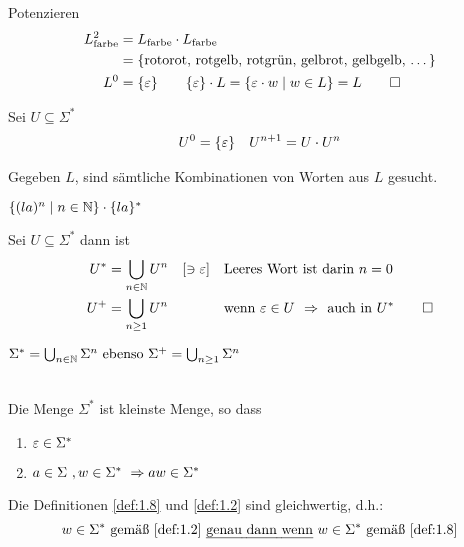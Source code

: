 Potenzieren
\begin{align*}
	L_\text{farbe}^2 &= L_\text{farbe}\cdot L_\text{farbe}\\
	&= \{ \text{rotorot, rotgelb, rotgrün, gelbrot, gelbgelb, \dots} \}\\
	L^0 &=\{\varepsilon\} \qquad \{\varepsilon\}\cdot L = \{\varepsilon\cdot w \mid w\in L\} = L \qedhere
\end{align*}
%
\begin{Def} Sei $U\subseteq\Sigma^*$
	\begin{align*}
		U^0 &= \{\varepsilon\} & U^{n+1}= U \cdot U^n
	\end{align*}
\end{Def}
Gegeben $L$, sind sämtliche Kombinationen von Worten aus $L$ gesucht.
\begin{Bsp*}
	$\{(la)^n \mid n\in\mathbb{N}\}\cdot\{la\}^*$
\end{Bsp*}
\vspace{.5em}
\begin{Def}
	Sei $U\subseteq\Sigma^*$ dann ist
	\begin{align*}
		U^* &= \bigcup_{n\in\N} U^n \quad [\ni\Eps] && \text{Leeres Wort ist darin }n=0\\
		U^+ &= \bigcup_{n\ge1} U^n && \text{wenn $\Eps\in U$ \=> auch in $U^*$} \qedhere
	\end{align*}
\end{Def}
\begin{Bemerkung}
	$\Sigma^*=\bigcup_{n\in\mathbb{N}}\Sigma^n \text{ ebenso } \Sigma^+ = \bigcup_{n\ge1}\Sigma^n$
\end{Bemerkung}
\begin{Def}\label{def:1.8}\ \\
	Die Menge $\Sigma^*$ ist kleinste Menge, so dass
	\begin{enumerate}[label={(\arabic*)}]
		\item $\varepsilon\in\Sigma^*$
		\item\label{def:1.8.2} $a\in\Sigma\ ,w\in\Sigma^*\ \=> aw\in\Sigma^*$\qedhere
	\end{enumerate}
\end{Def}
Die Definitionen \ref{def:1.8} und \ref{def:1.2} sind gleichwertig, d.h.:
\begin{displaymath}
w \in \Sigma^* \text{ gemäß \autoref{def:1.2} \emph{genau dann wenn} } w \in \Sigma^* \text{ gemäß \autoref{def:1.8}}
\end{displaymath}
